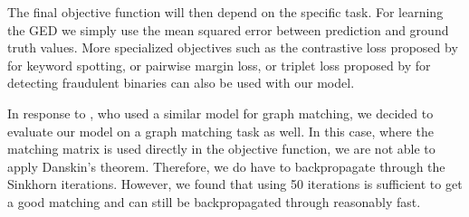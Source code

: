 The final objective function will then depend on the specific task. For learning the GED we simply use the mean squared error between prediction and ground truth values. More specialized objectives such as the contrastive loss proposed by \cite{riba2018} for keyword spotting, or pairwise margin loss, or triplet loss proposed by \cite{li2019} for detecting fraudulent binaries can also be used with our model.

In response to \cite{fey2020_update}, who used a similar model for graph matching, we decided to evaluate our model on a graph matching task as well. In this case, where the matching matrix is used directly in the objective function, we are not able to apply Danskin's theorem. Therefore, we do have to backpropagate through the Sinkhorn iterations. However, we found that using 50 iterations is sufficient to get a good matching and can still be backpropagated through reasonably fast.

